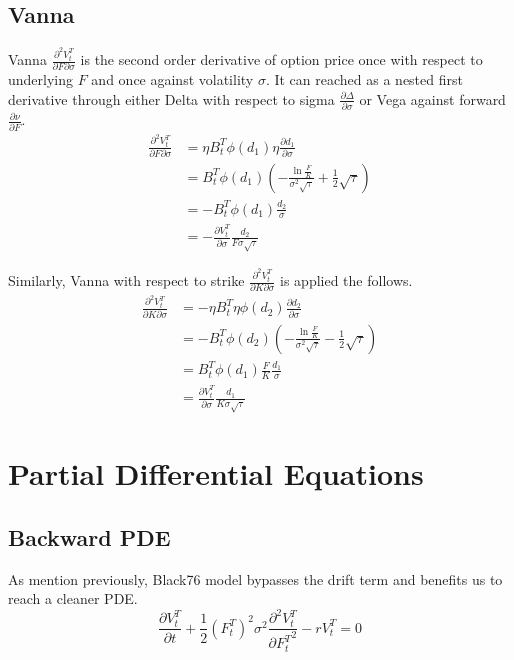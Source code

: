 \documentclass{article}
\begin{document}
\subsection{Vanna}

Vanna $ \frac{\partial^2 V_t^T}{\partial F \partial \sigma} $ is the second order derivative of option price once with respect to underlying $ F $ and once against volatility $ \sigma $.
It can reached as a nested first derivative through either Delta with respect to sigma $ \frac{\partial \Delta}{\partial \sigma} $ or Vega against forward $ \frac{\partial \nu}{\partial F} $.
\begin{align}
    \frac{\partial^2 V_t^T}{\partial F \partial \sigma} &= \eta B_t^T \phi(d_1) \eta \frac{\partial d_1}{\partial \sigma} \nonumber \\
    &= B_t^T \phi(d_1) \left(-\frac{\ln{\frac{F}{K}}}{\sigma^2 \sqrt{\tau}} + \frac{1}{2} \sqrt{\tau}\right) \nonumber \\
    &= -B_t^T \phi(d_1) \frac{d_2}{\sigma} \nonumber \\
    &= -\frac{\partial V_t^T}{\partial \sigma} \frac{d_2}{F \sigma \sqrt{\tau}}
\end{align}

Similarly, Vanna with respect to strike $ \frac{\partial^2 V_t^T}{\partial K \partial \sigma} $ is applied the follows.
\begin{align}
    \frac{\partial^2 V_t^T}{\partial K \partial \sigma} &= -\eta B_t^T \eta \phi(d_2) \frac{\partial d_2}{\partial \sigma} \nonumber \\
    &= -B_t^T \phi(d_2) \left(-\frac{\ln{\frac{F}{K}}}{\sigma^2 \sqrt{\tau}} - \frac{1}{2} \sqrt{\tau} \right) \nonumber \\
    &= B_t^T \phi(d_1) \frac{F}{K} \frac{d_1}{\sigma} \nonumber \\
    &= \frac{\partial V_t^T}{\partial \sigma} \frac{d_1}{K \sigma \sqrt{\tau}}
\end{align}


\section{Partial Differential Equations}

\subsection{Backward PDE}
As mention previously, Black76 model bypasses the drift term and benefits us to reach a cleaner PDE.
\begin{equation} \label{Black76 Backward PDE}
    \frac{\partial V_t^T}{\partial t} + \frac{1}{2} {\left(F_t^T \right)}^2 \sigma^2 \frac{\partial^2 V_t^T}{{\partial F_t^T}^2} - r V_t^T = 0
\end{equation}
\end{document}
